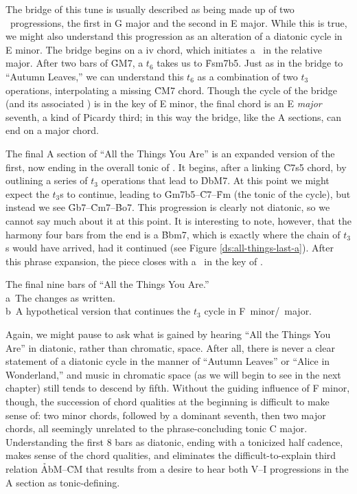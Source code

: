 \documentclass[diss]{subfiles}
\begin{document}
The bridge of this tune is usually described as being made up of two \tfo\
progressions, the first in G major and the second in E major. While this is
true, we might also understand this progression as an alteration of a diatonic
cycle in E minor.  The bridge begins on a iv chord, which initiates a \tfo\ in
the relative major. After two bars of \h{GM7}, a $t_6$ takes us to \h{Fsm7b5}.
Just as in the bridge to “Autumn Leaves,” we can understand this $t_6$ as a
combination of two $t_3$ operations, interpolating a missing \h{CM7}
chord.\fn{ds-19} Though the cycle of the bridge (and its associated \gis{}) is in
the key of E minor, the final chord is an E \emph{major} seventh, a kind of
Picardy third; in this way the bridge, like the A sections, can end on a major
chord.

The final A section of “All the Things You Are” is an expanded version of the
first, now ending in the overall tonic of \Aflat. It begins, after a linking
\h{C7s5} chord, by outlining a series of $t_3$ operations that lead to
\h{DbM7}.\fn{ds-20} At this point we might expect the $t_3$s to continue,
leading to \h{Gm7b5}--\h{C7}--\h{Fm} (the tonic of the cycle), but instead we
see \h{Gb7}--\h{Cm7}--\h{Bo7}. This progression is clearly not diatonic, so we
cannot say much about it at this point. It is interesting to note, however,
that the harmony four bars from the end is a \h{Bbm7}, which is exactly where the
chain of $t_3$s would have arrived, had it continued (see Figure
\ref{ds:all-things-last-a}). After this phrase expansion, the piece closes
with a \tfo\ in the key of \Aflat.

\figBeg[htbp]
  \captionsetup{format=hang}
  \caption[Two versions of “All the Things You Are,” final nine bars.]{The
  final nine bars of “All the Things You Are.” \\
  a\rightparen\ The changes as written. \\
  b\rightparen\ A hypothetical version that continues the $t_3$ cycle in \mbox{F
    minor/}\Aflat\ major.}
  \label{ds:all-things-last-a}
\figEnd

Again, we might pause to ask what is gained by hearing “All the Things You
Are” in diatonic, rather than chromatic, space. After all, there is never a
clear statement of a diatonic cycle in the manner of “Autumn Leaves” or “Alice
in Wonderland,” and music in chromatic space (as we will begin to see in the
next chapter) still tends to descend by fifth. Without the guiding influence
of F minor, though, the succession of chord qualities at the beginning is
difficult to make sense of: two minor chords, followed by a dominant seventh,
then two major chords, all seemingly unrelated to the phrase-concluding tonic
C major.\fn{ds-21} Understanding the first 8 bars as diatonic, ending with a
tonicized half cadence, makes sense of the chord qualities, and eliminates the
difficult-\hspace{0pt}to-explain third relation \h{AbM}--\h{CM} that results
from a desire to hear both \mbox{V--I} progressions in the A section as
tonic-defining.\fn{ds-22}
\end{document}
